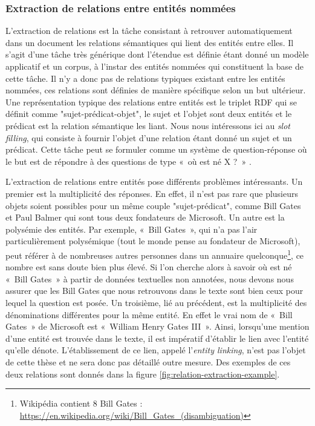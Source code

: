 \documentclass[12pt,a4paper,times,twoside,openright]{report}
\begin{document}
        \subsubsection{Extraction de relations entre entités nommées}
L'extraction de relations est la tâche consistant à retrouver automatiquement dans un document les relations sémantiques qui lient des entités entre elles. Il s'agit d'une tâche très générique dont l'étendue est définie étant donné un modèle applicatif et un corpus, à l'instar des entités nommées qui constituent la base de cette tâche. Il n'y a donc pas de relations typiques existant entre les entités nommées, ces relations sont définies de manière spécifique selon un but ultérieur. Une représentation typique des relations entre entités est le triplet RDF \citep{lassila1998resource} qui se définit comme "sujet-prédicat-objet", le sujet et l'objet sont deux entités et le prédicat est la relation sémantique les liant.
Nous nous intéressons ici au \textit{slot filling}, qui consiste à fournir l'objet d'une relation étant donné un sujet et un prédicat. Cette tâche peut se formuler comme un système de question-réponse où le but est de répondre à des questions de type «\ où est né X ?\ » \citep{surdeanu2013overview,surdeanu2014overview}.

L'extraction de relations entre entités pose différents problèmes intéressants. Un premier est la multiplicité des réponses. En effet, il n'est pas rare que plusieurs objets soient possibles pour un même couple "sujet-prédicat", comme Bill Gates et Paul Balmer qui sont tous deux fondateurs de Microsoft. Un autre est la polysémie des entités. Par exemple, «\ Bill Gates\ », qui n'a pas l'air particulièrement polysémique (tout le monde pense au fondateur de Microsoft), peut référer à de nombreuses autres personnes dans un annuaire quelconque\footnote{Wikipédia contient 8 Bill Gates : \url{https://en.wikipedia.org/wiki/Bill_Gates_(disambiguation)}}, ce nombre est sans doute bien plus élevé. Si l'on cherche alors à savoir où est né «\ Bill Gates\ » à partir de données textuelles non annotées, nous devons nous assurer que les Bill Gates que nous retrouvons dans le texte sont bien ceux pour lequel la question est posée.  Un troisième, lié au précédent, est la multiplicité des dénominations différentes pour la même entité. En effet le vrai nom de «\ Bill Gates\ » de Microsoft est «\ William Henry Gates III\ ». Ainsi, lorsqu'une mention d'une entité est trouvée dans le texte, il est impératif d'établir le lien avec l'entité qu'elle dénote. L'établissement de ce lien, appelé l'\textit{entity linking}, n'est pas l'objet de cette thèse et ne sera donc pas détaillé outre mesure. Des exemples de ces deux relations sont donnés dans la figure \ref{fig:relation-extraction-example}.
\end{document}
